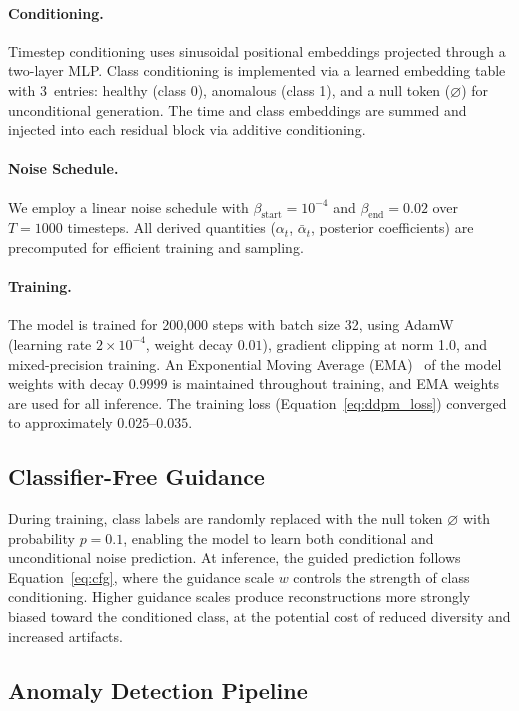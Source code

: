 \paragraph{Conditioning.} Timestep conditioning uses sinusoidal positional embeddings projected through a two-layer MLP. Class conditioning is implemented via a learned embedding table with 3~entries: healthy (class 0), anomalous (class 1), and a null token ($\varnothing$) for unconditional generation. The time and class embeddings are summed and injected into each residual block via additive conditioning.

\paragraph{Noise Schedule.} We employ a linear noise schedule with $\beta_{\text{start}} = 10^{-4}$ and $\beta_{\text{end}} = 0.02$ over $T = 1000$ timesteps. All derived quantities ($\alpha_t$, $\bar{\alpha}_t$, posterior coefficients) are precomputed for efficient training and sampling.

\paragraph{Training.} The model is trained for 200,000 steps with batch size 32, using AdamW (learning rate $2 \times 10^{-4}$, weight decay $0.01$), gradient clipping at norm 1.0, and mixed-precision training. An Exponential Moving Average (EMA)~\cite{polyak1992acceleration} of the model weights with decay $0.9999$ is maintained throughout training, and EMA weights are used for all inference. The training loss (Equation~\ref{eq:ddpm_loss}) converged to approximately $0.025$--$0.035$.

\subsection{Classifier-Free Guidance}
\label{sec:cfg}

During training, class labels are randomly replaced with the null token $\varnothing$ with probability $p = 0.1$, enabling the model to learn both conditional and unconditional noise prediction. At inference, the guided prediction follows Equation~\ref{eq:cfg}, where the guidance scale $w$ controls the strength of class conditioning. Higher guidance scales produce reconstructions more strongly biased toward the conditioned class, at the potential cost of reduced diversity and increased artifacts.

\subsection{Anomaly Detection Pipeline}
\label{sec:anomaly_pipeline}

